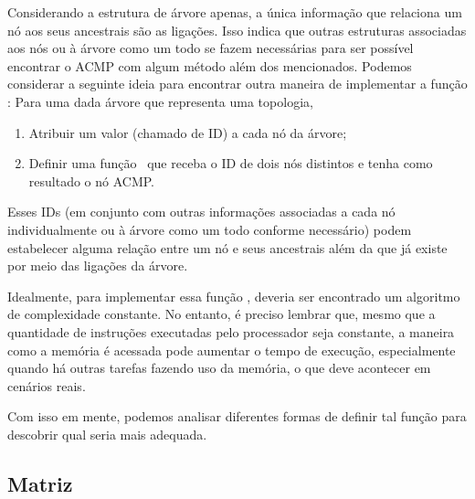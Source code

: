 



Considerando a estrutura de árvore apenas, a única informação que relaciona um nó aos seus ancestrais são as ligações.
Isso indica que outras estruturas associadas aos nós ou à árvore como um todo se fazem necessárias
para ser possível encontrar o ACMP com algum método além dos mencionados.
Podemos considerar a seguinte ideia para encontrar outra maneira de implementar a função \fACMP:
Para uma dada árvore que representa uma topologia,
\begin{enumerate}
	\item Atribuir um valor (chamado de ID) a cada nó da árvore;
	\item Definir uma função \ACMPIDs\ que receba o ID de dois nós distintos e tenha como resultado o nó ACMP.
\end{enumerate}
Esses IDs (em conjunto com outras informações associadas a cada nó individualmente ou à árvore como um todo conforme necessário)
podem estabelecer alguma relação entre um nó e seus ancestrais além da que já existe por meio das ligações da árvore.

Idealmente, para implementar essa função \ACMPIDs, deveria ser encontrado um algoritmo de complexidade constante.
No entanto, é preciso lembrar que, mesmo que a quantidade de instruções executadas pelo processador seja constante,
a maneira como a memória é acessada pode aumentar o tempo de execução, especialmente quando há outras tarefas fazendo uso da memória, o que deve acontecer em cenários reais.

Com isso em mente, podemos analisar diferentes formas de definir tal função para descobrir qual seria mais adequada.

\subsection{Matriz}

